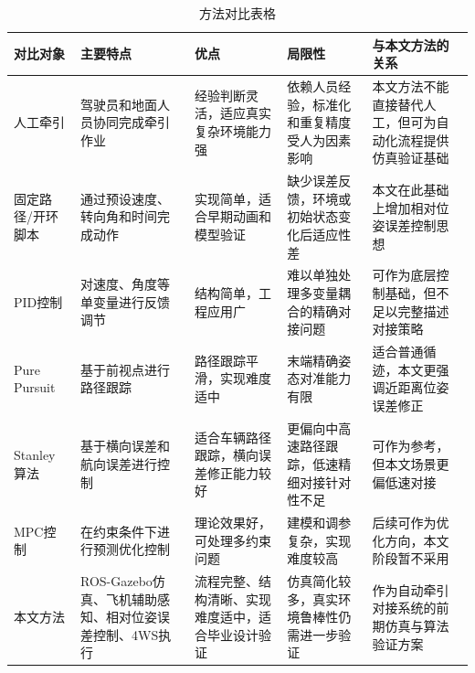 \begin{landscape}
\begin{table}[htbp]
\centering
\caption*{方法对比表格}
\renewcommand{\arraystretch}{1.2}
\small
\begin{tabularx}{\linewidth}{p{2.6cm}X X X X}
\toprule
对比对象 & 主要特点 & 优点 & 局限性 & 与本文方法的关系\\
\midrule
人工牵引 & 驾驶员和地面人员协同完成牵引作业 & 经验判断灵活，适应真实复杂环境能力强 & 依赖人员经验，标准化和重复精度受人为因素影响 & 本文方法不能直接替代人工，但可为自动化流程提供仿真验证基础\\
固定路径/开环脚本 & 通过预设速度、转向角和时间完成动作 & 实现简单，适合早期动画和模型验证 & 缺少误差反馈，环境或初始状态变化后适应性差 & 本文在此基础上增加相对位姿误差控制思想\\
PID控制 & 对速度、角度等单变量进行反馈调节 & 结构简单，工程应用广 & 难以单独处理多变量耦合的精确对接问题 & 可作为底层控制基础，但不足以完整描述对接策略\\
Pure Pursuit & 基于前视点进行路径跟踪 & 路径跟踪平滑，实现难度适中 & 末端精确姿态对准能力有限 & 适合普通循迹，本文更强调近距离位姿误差修正\\
Stanley算法 & 基于横向误差和航向误差进行控制 & 适合车辆路径跟踪，横向误差修正能力较好 & 更偏向中高速路径跟踪，低速精细对接针对性不足 & 可作为参考，但本文场景更偏低速对接\\
MPC控制 & 在约束条件下进行预测优化控制 & 理论效果好，可处理多约束问题 & 建模和调参复杂，实现难度较高 & 后续可作为优化方向，本文阶段暂不采用\\
本文方法 & ROS-Gazebo仿真、飞机辅助感知、相对位姿误差控制、4WS执行 & 流程完整、结构清晰、实现难度适中，适合毕业设计验证 & 仿真简化较多，真实环境鲁棒性仍需进一步验证 & 作为自动牵引对接系统的前期仿真与算法验证方案\\
\bottomrule
\end{tabularx}
\end{table}
\end{landscape}

